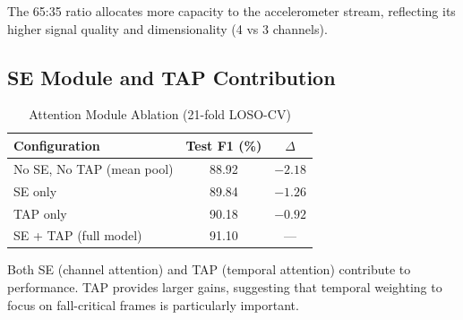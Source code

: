 The 65:35 ratio allocates more capacity to the accelerometer stream, reflecting its higher signal quality and dimensionality (4 vs 3 channels).

\subsection{SE Module and TAP Contribution}

\begin{table}[htbp]
\centering
\caption{Attention Module Ablation (21-fold LOSO-CV)}
\label{tab:attention_ablation}
\begin{tabular}{@{}lcc@{}}
\toprule
\textbf{Configuration} & \textbf{Test F1 (\%)} & \textbf{$\Delta$} \\
\midrule
No SE, No TAP (mean pool) & 88.92 & $-2.18$ \\
SE only & 89.84 & $-1.26$ \\
TAP only & 90.18 & $-0.92$ \\
SE + TAP (full model) & 91.10 & --- \\
\bottomrule
\end{tabular}
\end{table}

Both SE (channel attention) and TAP (temporal attention) contribute to performance. TAP provides larger gains, suggesting that temporal weighting to focus on fall-critical frames is particularly important.
